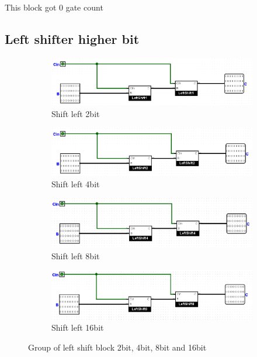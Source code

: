 \documentclass{article}
\begin{document}
\hspace{2em}This block got 0 gate count
\subsection{Left shifter higher bit}
\begin{figure}[H]
    \centering
    \begin{subfigure}{0.45\textwidth}
        \centering
        \includegraphics[width=\linewidth]{images/LeftShift2.png}
        \caption{Shift left 2bit}
        \label{fig:sub1}
    \end{subfigure}
    \hfill
    \begin{subfigure}{0.45\textwidth}
        \centering
        \includegraphics[width=\linewidth]{images/LeftShift4.png}
        \caption{Shift left 4bit}
        \label{fig:sub2}
    \end{subfigure}

    \vspace{0.5cm} %

    \begin{subfigure}{0.45\textwidth}
        \centering
        \includegraphics[width=\linewidth]{images/LeftShift8.png}
        \caption{Shift left 8bit}
        \label{fig:sub3}
    \end{subfigure}
    \hfill
    \begin{subfigure}{0.45\textwidth}
        \centering
        \includegraphics[width=\linewidth]{images/LeftShift16.png}
        \caption{Shift left 16bit}
        \label{fig:sub4}
    \end{subfigure}
    \caption{Group of left shift block 2bit, 4bit, 8bit and 16bit}
    \label{fig:group}
\end{figure}
\end{document}
